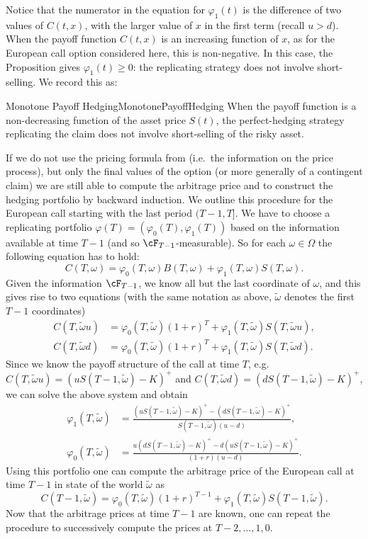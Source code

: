 Notice that the numerator in the equation for \(\varphi_1(t)\) is the difference of two values of \(C(t, x)\), with the larger value of \(x\) in the first term (recall \(u > d\)). When the payoff function \(C(t, x)\) is an increasing function of \(x\), as for the European call option considered here, this is non-negative. In this case, the Proposition gives \(\varphi_1(t) \ge 0\): the replicating strategy does not involve short-selling. We record this as:

\begin{cor}{Monotone Payoff Hedging}{MonotonePayoffHedging}
	When the payoff function is a non-decreasing function of the asset price \(S(t)\), the perfect-hedging strategy replicating the claim does not involve short-selling of the risky asset.
\end{cor}

If we do not use the pricing formula from  (i.e.\ the information on the price process), but only the final values of the option (or more generally of a contingent claim) we are still able to compute the arbitrage price and to construct the hedging portfolio by backward induction. We outline this procedure for the European call starting with the last period \((T-1, T]\). We have to choose a replicating portfolio \(\varphi(T) = (\varphi_0(T), \varphi_1(T))\) based on the information available at time \(T-1\) (and so \(\cF_{T-1}\)-measurable). So for each \(\omega \in \Omega\) the following equation has to hold:
\[
	C(T, \omega) = \varphi_0(T, \omega)B(T, \omega) + \varphi_1(T, \omega)S(T, \omega).
\]
Given the information \(\cF_{T-1}\), we know all but the last coordinate of \(\omega\), and this gives rise to two equations (with the same notation as above, \(\tilde{\omega}\) denotes the first \(T-1\) coordinates)
\begin{align*}
	C(T, \tilde{\omega}u) & = \varphi_0(T, \tilde{\omega})(1+r)^T + \varphi_1(T, \tilde{\omega})S(T, \tilde{\omega}u), \\
	C(T, \tilde{\omega}d) & = \varphi_0(T, \tilde{\omega})(1+r)^T + \varphi_1(T, \tilde{\omega})S(T, \tilde{\omega}d).
\end{align*}
Since we know the payoff structure of the call at time \(T\), e.g.\ \(C(T, \tilde{\omega}u) = (uS(T-1, \tilde{\omega}) - K)^{+}\) and \(C(T, \tilde{\omega}d) = (dS(T-1, \tilde{\omega}) - K)^{+}\), we can solve the above system and obtain
\begin{align*}
	\varphi_1(T, \tilde{\omega}) & = \frac{(uS(T-1, \tilde{\omega}) - K)^{+} - (dS(T-1, \tilde{\omega}) - K)^{+}}{S(T-1, \tilde{\omega})(u - d)}, \\
	\varphi_0(T, \tilde{\omega}) & = \frac{u(dS(T-1, \tilde{\omega}) - K)^{+} - d(uS(T-1, \tilde{\omega}) - K)^{+}}{(1+r)(u - d)}.
\end{align*}
Using this portfolio one can compute the arbitrage price of the European call at time \(T-1\) in state of the world \(\tilde{\omega}\) as
\[
	C(T-1, \tilde{\omega}) = \varphi_0(T, \tilde{\omega})(1+r)^{T-1} + \varphi_1(T, \tilde{\omega})S(T-1, \tilde{\omega}).
\]
Now that the arbitrage prices at time \(T-1\) are known, one can repeat the procedure to successively compute the prices at \(T-2, \dots, 1, 0\).

